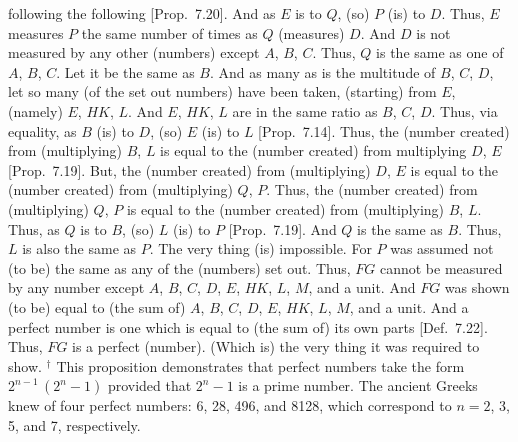 following the following [Prop.~7.20].
And as $E$ is to $Q$, (so) $P$ (is) to $D$. Thus, $E$ measures $P$ the same number of times as $Q$ (measures) $D$. And $D$ is not measured by any
other (numbers) except $A$, $B$, $C$.  Thus, $Q$ is the same as one
of $A$, $B$, $C$. Let it be the same as $B$. And as many as is the
multitude of $B$, $C$, $D$, let so many (of the set out numbers) have been taken, (starting) from $E$, 
(namely) $E$, $HK$, $L$. And $E$, $HK$, $L$ are in the same ratio as
$B$, $C$, $D$. Thus, via equality, as $B$ (is) to $D$, (so) $E$ (is) to $L$
[Prop.~7.14]. Thus, the (number created) from
(multiplying) $B$, $L$ is equal to the (number created) from multiplying
$D$, $E$ [Prop.~7.19]. But, the (number created)
from (multiplying) $D$, $E$ is equal to the (number created) from (multiplying)
$Q$, $P$. Thus, the (number created) from (multiplying) $Q$, $P$
is equal to the (number created) from (multiplying) $B$, $L$. Thus, as
$Q$ is to $B$, (so) $L$ (is) to $P$ [Prop.~7.19]. 
And $Q$ is the same as $B$. Thus, $L$ is also the same as $P$. The
very thing (is) impossible. For $P$ was assumed not (to be) the same
as any of the (numbers) set out. Thus, $FG$ cannot be measured by any number except $A$, $B$, $C$, $D$, $E$, $HK$, $L$, $M$, and a unit.
And $FG$ was shown (to be) equal to (the sum of) $A$, $B$, $C$, $D$, $E$, $HK$,
$L$, $M$, and a unit. And a perfect number is one which is equal to (the sum of) its own
parts [Def.~7.22]. Thus, $FG$ is a perfect (number).
(Which is) the very thing it was required to show.
{\footnotesize\noindent$^\dag$ This proposition demonstrates that perfect
numbers take the form $2^{n-1}\,(2^n-1)$ provided that $2^n-1$ is a prime
number. The ancient Greeks knew of four perfect numbers: 6, 28, 496, and
8128, which correspond to $n= 2$, 3, 5, and 7, respectively.}

\newpage
\thispagestyle{plain}
~\\